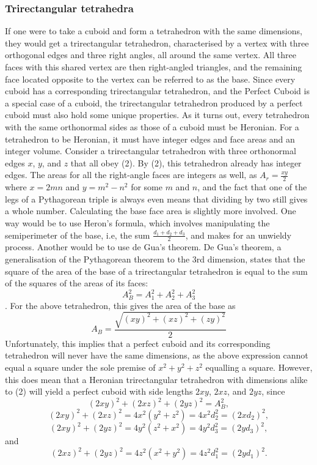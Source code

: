 \documentclass[11pt]{article}
\begin{document}
\subsubsection{Trirectangular tetrahedra}
If one were to take a cuboid and form a tetrahedron with the same dimensions, they would get a trirectangular tetrahedron, characterised by a vertex with three orthogonal edges and three right angles, all around the same vertex. All three faces with this shared vertex are then right-angled triangles, and the remaining face located opposite to the vertex can be referred to as the base. 
Since every cuboid has a corresponding trirectangular tetrahedron, and the Perfect Cuboid is a special case of a cuboid, the trirectangular tetrahedron produced by a perfect cuboid must also hold some unique properties. As it turns out, every tetrahedron with the same orthonormal sides as those of a cuboid must be Heronian. For a tetrahedron to be Heronian, it must have integer edges and face areas and an integer volume.
Consider a trirectangular tetrahedron with three orthonormal edges $x$, $y$, and $z$ that all obey (2).
By (2), this tetrahedron already has integer edges. The areas for all the right-angle faces are integers as well, as $A_r=\frac{xy}{2}$ where $x=2mn$ and $y=m^2-n^2$ for some $m$ and $n$, and the fact that one of the legs of a Pythagorean triple is always even means that dividing by two still gives a whole number. 
Calculating the base face area is slightly more involved. One way would be to use Heron's formula, which involves manipulating the semiperimeter of the base, i.e, the sum $\frac{d_1+d_2+d_3}{2}$, and makes for an unwieldy process. Another would be to use de Gua's theorem. De Gua's theorem, a generalisation of the Pythagorean theorem to the 3rd dimension, states that the square of the area of the base of a trirectangular tetrahedron is equal to the sum of the squares of the areas of its faces:
$$A_B^2=A_1^2+A_2^2+A_3^2$$.
For the above tetrahedron, this gives the area of the base as
$$A_B=\frac{\sqrt{(xy)^2+(xz)^2+(zy)^2}}{2}$$
Unfortunately, this implies that a perfect cuboid and its corresponding tetrahedron will never have the same dimensions, as the above expression cannot equal a square under the sole premise of $x^2+y^2+z^2$ equalling a square. However, this does mean that a Heronian trirectangular tetrahedron with dimensions alike to (2) will yield a perfect cuboid with side lengths $2xy$, $2xz$, and $2yz$, since
$$(2xy)^2+(2xz)^2+(2yz)^2=A_B^2,$$
$$(2xy)^2+(2xz)^2=4x^2(y^2+z^2)=4x^2d_2^2=(2xd_2)^2,$$
$$(2xy)^2+(2yz)^2=4y^2(z^2+x^2)=4y^2d_3^2=(2yd_3)^2,$$
and
$$(2xz)^2+(2yz)^2=4z^2(x^2+y^2)=4z^2d_1^2=(2yd_1)^2.$$
\end{document}
